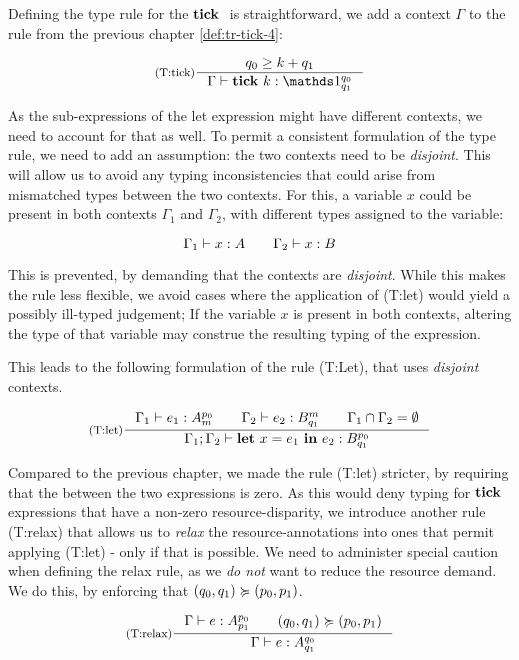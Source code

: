 Defining the type rule for the \(\mathbf{tick}~\) is straightforward, we add a context \(\Gamma\) to the rule from the previous chapter \cref{def:tr-tick-4}:

\[
   \inference[(T:tick)]
   {q_0 \geq k + q_1}
   {\typing{\Gamma}{\tick{k}}{\ratype{\unit}{q_0}{q_1}}}
\]

\begin{remark}
   As the sub-expressions of the let expression might have different contexts, we need to account for that as well. To permit a consistent formulation of the type rule, we need to add an assumption: the two contexts need to be \emph{disjoint}. This will allow us to avoid any typing inconsistencies that could arise from mismatched types between the two contexts. 
   For this, a variable \(x\) could be present in both contexts \(\Gamma_1\) and \(\Gamma_2\), with different types assigned to the variable:

   \[
      \Gamma_1 \vdash x : A \qquad \Gamma_2 \vdash x : B
   \]

   This is prevented, by demanding that the contexts are \emph{disjoint}. While this makes the rule less flexible, we avoid cases where the application of (T:let) would yield a possibly ill-typed judgement; If the variable \(x\) is present in both contexts, altering the type of that variable may construe the resulting typing of the expression.
\end{remark}

This leads to the following formulation of the rule (T:Let), that uses \emph{disjoint} contexts.

\[
   \inference[(T:let)]
   {\typing{\Gamma_1}{e_1}{\ratype{A}{p_0}{m}} \qquad \typing{\Gamma_2}{e_2}{\ratype{B}{m}{q_1}} \qquad \Gamma_1 \cap \Gamma_2 = \emptyset}
   {\typing{\Gamma_1; \Gamma_2}{\letexp{x}{e_1}{e_2}}{\ratype{B}{p_0}{q_1}}}
\]

Compared to the previous chapter, we made the rule (T:let) stricter, by requiring that the  between the two expressions is zero. As this would deny typing for \(\mathbf{tick}~\) expressions that have a non-zero resource-disparity, we introduce another rule (T:relax) that allows us to \emph{relax} the resource-annotations into ones that permit applying (T:let) - only if that is possible. 
We need to administer special caution when defining the relax rule, as we \emph{do not} want to reduce the resource demand. We do this, by enforcing that \((q_0, q_1) \succcurlyeq (p_0, p_1)\).

\[
   \inference[(T:relax)]
   {\typing{\Gamma}{e}{\ratype{A}{p_0}{p_1}} \qquad (q_0, q_1) \relaxation (p_0, p_1)}
   {\typing{\Gamma}{e}{\ratype{A}{q_0}{q_1}}}
\]



